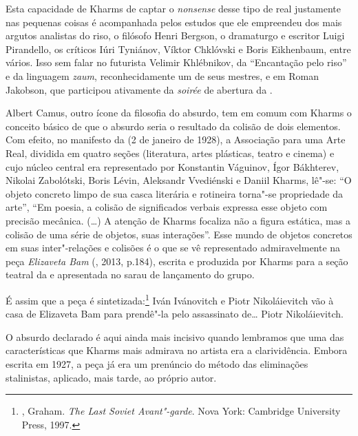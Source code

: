 Esta capacidade de Kharms de captar o \emph{nonsense} desse tipo de real
justamente nas pequenas coisas é acompanhada pelos estudos que ele
empreendeu dos mais argutos analistas do riso, o filósofo Henri Bergson,
o dramaturgo e escritor Luigi Pirandello, os críticos Iúri Tyniánov,
Víktor Chklóvski e Boris Eikhenbaum, entre vários. Isso sem falar no
futurista Velimir Khlébnikov, da ``Encantação pelo riso'' e da linguagem
\emph{zaum}, reconhecidamente um de seus mestres, e em Roman Jakobson,
que participou ativamente da \emph{soirée} de abertura da
.

Albert Camus, outro ícone da filosofia do absurdo, tem em comum com
Kharms o conceito básico de que o absurdo seria o resultado da colisão
de dois elementos. Com efeito, no manifesto da  (2 de
janeiro de 1928), a Associação para uma Arte Real, dividida em quatro
seções (literatura, artes plásticas, teatro e cinema) e cujo núcleo
central era representado por Konstantin Váguinov, Ígor Bákhterev,
Nikolai Zabolótski, Boris Lévin, Aleksandr Vvediénski e Daniil Kharms, lê"-se: ``O objeto concreto limpo de sua casca literária e rotineira
torna"-se propriedade da arte'', ``Em poesia, a colisão de
significados verbais expressa esse objeto com precisão mecânica.
(\ldots{}) A atenção de Kharms focaliza não a figura estática, mas a
colisão de uma série de objetos, suas interações''. Esse mundo de
objetos concretos em suas inter"-relações e colisões é o que se vê
representado admiravelmente na peça \emph{Elizaveta Bam} (, 2013, p.184), escrita
e produzida por Kharms para a seção teatral da  e
apresentada no sarau de lançamento do grupo.

É assim que a peça é sintetizada:\footnote{, Graham. \emph{The Last Soviet Avant"-garde}. Nova York: Cambridge University Press, 1997.} Iván Ivánovitch e Piotr Nikoláievitch vão à casa de Elizaveta Bam para
prendê"-la pelo assassinato de\ldots{} Piotr Nikoláievitch.

O absurdo declarado é aqui ainda mais incisivo quando lembramos que uma
das características que Kharms mais admirava no artista era a
clarividência. Embora escrita em 1927, a peça já era um prenúncio do
método das eliminações stalinistas, aplicado, mais tarde, ao próprio
autor.

